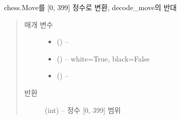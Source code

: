 \documentclass[letterpaper,10pt,english]{sphinxmanual}
\begin{document}
\begin{fulllineitems}
\label{\detokenize{agents.self_learning:agents.self_learning.utils.encode_move}}
chess.Move를 {[}0, 399{]} 정수로 변환, decode\_move의 반대
\begin{quote}\begin{description}
\item[{매개 변수}] \leavevmode\begin{itemize}
\item {} 
 () -- 

\item {} 
 () -- white=True, black=False

\item {} 
 () -- 

\end{itemize}

\item[{반환}] \leavevmode
(int) -- 정수 {[}0, 399{]} 범위

\end{description}\end{quote}

\end{fulllineitems}

\end{document}
